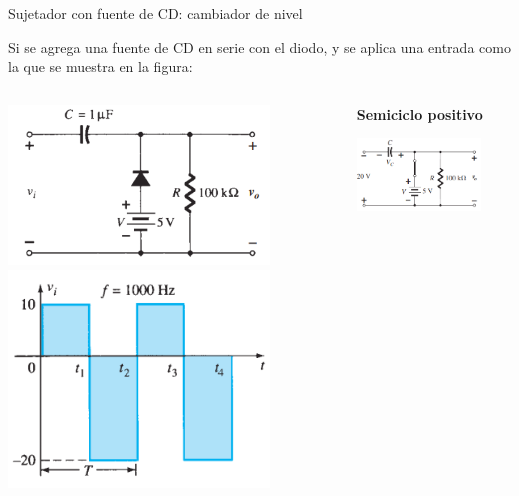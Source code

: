 \documentclass[t,aspectratio=169]{beamer}
\begin{document}
\begin{frame}{Sujetador con fuente de CD: cambiador de nivel}

Si se agrega una fuente de CD en serie con el diodo, y se aplica una entrada como la que se muestra en la figura:

\begin{columns}
\begin{column}{0.33\textwidth}

    \centering
    \includegraphics[width=0.8\textwidth]{figures/cambiador_nivel_1a.png}
    \includegraphics[width=0.8\textwidth]{figures/cambiador_nivel_1b.png}

\end{column}
\begin{column}{0.33\textwidth}

    \textbf{Semiciclo positivo}

    \centering
    \includegraphics[width=0.8\textwidth]{figures/cambiador_nivel_2.png}


\end{column}
\end{columns}
\end{frame}
\end{document}
